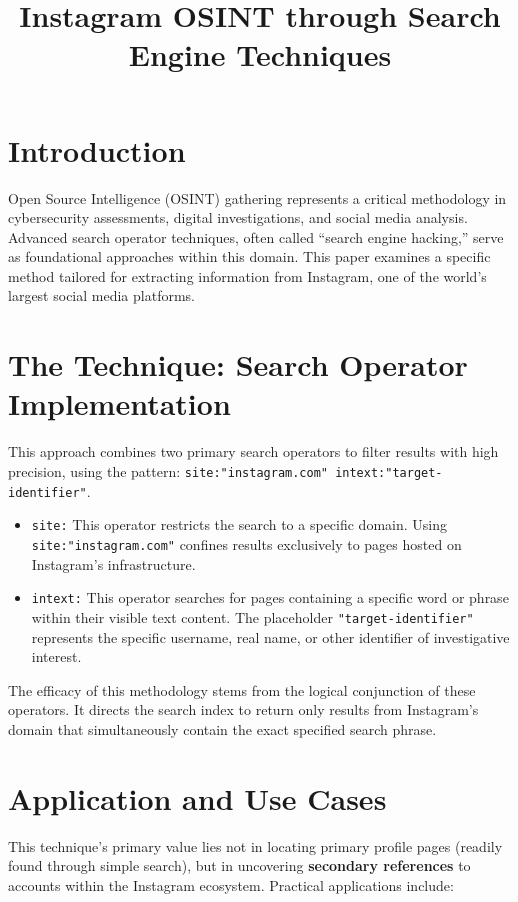 \documentclass[12pt]{article}
\title{Instagram OSINT through Search Engine Techniques}
\author{}
\date{}
\begin{document}
\maketitle

\section{Introduction}

Open Source Intelligence (OSINT) gathering represents a critical methodology in cybersecurity assessments, digital investigations, and social media analysis. Advanced search operator techniques, often called ``search engine hacking,'' serve as foundational approaches within this domain. This paper examines a specific method tailored for extracting information from Instagram, one of the world's largest social media platforms.

\section{The Technique: Search Operator Implementation}

This approach combines two primary search operators to filter results with high precision, using the pattern: \texttt{site:"instagram.com" intext:"target-identifier"}.

\begin{itemize}
    \item \texttt{site:} This operator restricts the search to a specific domain. Using \texttt{site:"instagram.com"} confines results exclusively to pages hosted on Instagram's infrastructure.
    \item \texttt{intext:} This operator searches for pages containing a specific word or phrase within their visible text content. The placeholder \texttt{"target-identifier"} represents the specific username, real name, or other identifier of investigative interest.
\end{itemize}

The efficacy of this methodology stems from the logical conjunction of these operators. It directs the search index to return only results from Instagram's domain that simultaneously contain the exact specified search phrase.

\section{Application and Use Cases}

This technique's primary value lies not in locating primary profile pages (readily found through simple search), but in uncovering \textbf{secondary references} to accounts within the Instagram ecosystem. Practical applications include:
\end{document}
